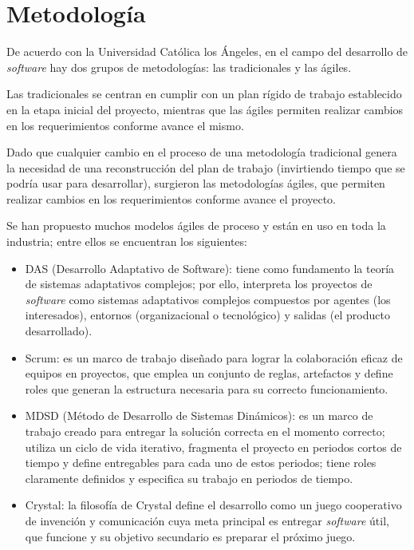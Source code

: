 
\section{Metodología}
De acuerdo con la Universidad Católica los Ángeles\cite{universidad_catolica_los_angeles_metodologidesarrollo_2020}, en el campo del desarrollo de \textit{software} hay dos grupos de metodologías: las tradicionales y las ágiles.


Las tradicionales se centran en cumplir con un plan rígido de trabajo establecido en la etapa inicial del proyecto, mientras que las ágiles permiten realizar cambios en los requerimientos conforme avance el mismo.


Dado que cualquier cambio en el proceso de una metodología tradicional genera la necesidad de una reconstrucción del plan de trabajo (invirtiendo tiempo que se podría usar para desarrollar), surgieron las metodologías ágiles, que permiten realizar cambios en los requerimientos conforme avance el proyecto.


Se han propuesto muchos modelos ágiles de proceso y están en uso en toda la industria; entre ellos se encuentran los siguientes:


\begin{itemize}
	\item DAS (Desarrollo Adaptativo de Software): tiene como fundamento la teoría de sistemas adaptativos complejos; por ello, interpreta los proyectos de \textit{software} como sistemas adaptativos complejos compuestos
    por agentes (los interesados), entornos (organizacional o tecnológico) y salidas (el producto desarrollado)\cite{cadavid_revision_2013}.
	\item Scrum: es un marco de trabajo diseñado para lograr la colaboración eficaz de equipos en proyectos, que emplea un conjunto de reglas, artefactos y define roles que generan la estructura necesaria para su correcto funcionamiento\cite{cadavid_revision_2013}.
	\item MDSD (Método de Desarrollo de Sistemas Dinámicos): es un marco de trabajo creado para entregar la solución correcta en el momento correcto; utiliza un ciclo de vida iterativo, fragmenta el proyecto en periodos cortos de tiempo y define entregables para cada uno de estos periodos; tiene roles claramente definidos y especifica su trabajo en periodos de tiempo\cite{cadavid_revision_2013}.
	\item Crystal: la filosofía de Crystal define el desarrollo como un juego cooperativo de invención y comunicación cuya meta principal es entregar \textit{software} útil, que funcione y su objetivo secundario es preparar el próximo juego\cite{cadavid_revision_2013}.
\end{itemize}

